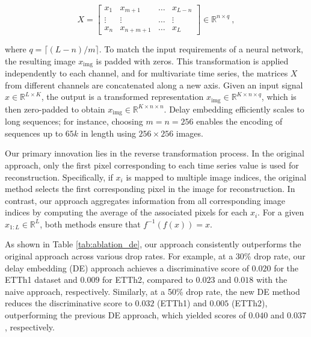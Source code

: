 \documentclass{article}
\theoremstyle{plain}
\theoremstyle{definition}
\theoremstyle{remark}
\begin{document}
\[
X = \begin{bmatrix}
    x_1 & x_{m+1} & \dots & x_{L-n} \\
    \vdots & \vdots & \dots & \vdots \\
    x_n & x_{n+m+1} & \dots & x_L
\end{bmatrix} \in \mathbb{R}^{n \times q} \ ,
\]

where \( q = \lceil (L-n)/m \rceil \). To match the input requirements of a neural network, the resulting image \( x_{\text{img}} \) is padded with zeros. This transformation is applied independently to each channel, and for multivariate time series, the matrices \( X \) from different channels are concatenated along a new axis. Given an input signal \( x \in \mathbb{R}^{L \times K} \), the output is a transformed representation \( x_{\text{img}} \in \mathbb{R}^{K \times n \times q} \), which is then zero-padded to obtain \( x_{\text{img}} \in \mathbb{R}^{K \times n \times n} \). Delay embedding efficiently scales to long sequences; for instance, choosing \( m=n=256 \) enables the encoding of sequences up to \( 65k \) in length using \( 256 \times 256 \) images.

Our primary innovation lies in the reverse transformation process. In the original approach, only the first pixel corresponding to each time series value is used for reconstruction. Specifically, if \( x_i \) is mapped to multiple image indices, the original method selects the first corresponding pixel in the image for reconstruction. In contrast, our approach aggregates information from all corresponding image indices by computing the average of the associated pixels for each \( x_i \). For a given \( x_{1:L} \in \mathbb{R}^L \), both methods ensure that \( f^{-1}(f(x)) = x \).

As shown in Table \ref{tab:ablation_de}, our approach consistently outperforms the original approach across various drop rates. For example, at a 30\% drop rate, our delay embedding (DE) approach achieves a discriminative score of $0.020$ for the ETTh1 dataset and $0.009$ for ETTh2, compared to $0.023$ and $0.018$ with the naive approach, respectively. Similarly, at a 50\% drop rate, the new DE method reduces the discriminative score to $0.032$ (ETTh1) and $0.005$ (ETTh2), outperforming the previous DE approach, which yielded scores of $0.040$ and $0.037$, respectively.
\end{document}
